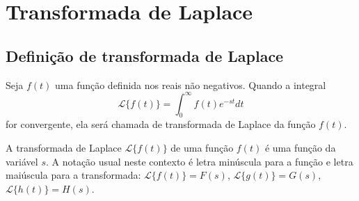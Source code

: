 


\chapter{Transformada de Laplace}
\section{Definição de transformada de Laplace}{\label{sec_1}}
\begin{defn}Seja $f(t)$ uma função definida nos reais não negativos. Quando a integral
$$
\mathcal{L}\{f(t)\}=\int_0^\infty f(t)e^{-st}dt
$$
for convergente, ela será chamada de transformada de Laplace da função $f(t)$.
\end{defn}
A transformada de Laplace $\mathcal{L}\{f(t)\}$ de uma função $f(t)$ é uma função da variável $s$. A notação usual neste contexto é letra minúscula para a função e letra maiúscula para a transformada: $\mathcal{L}\{f(t)\}=F(s)$, $\mathcal{L}\{g(t)\}=G(s)$, $\mathcal{L}\{h(t)\}=H(s)$.

